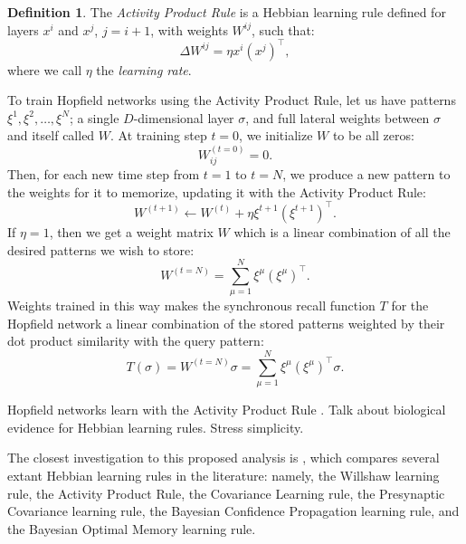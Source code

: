 \documentclass{article}
\theoremstyle{definition}
\newtheorem{definition}{Definition}[subsection]
\begin{document}
\begin{definition}
  The \textit{Activity Product Rule} is a Hebbian learning rule defined 
  for layers $x^i$ and $x^j$, $j = i+1$, with weights $W^{ij}$, such that:
  \begin{equation}
    \Delta W^{ij} = \eta x^i (x^j)^\top,
  \end{equation}
  where we call $\eta$ the \textit{learning rate}.
\end{definition}
\noindent
To train Hopfield networks using the Activity Product Rule,
let us have patterns $\xi^1, \xi^2, \dots, \xi^N$; a single 
$D$-dimensional layer $\sigma$, and full lateral weights between $\sigma$
and itself called $W$. At training step $t=0$, we initialize $W$ 
to be all zeros:
\begin{equation}
  W^{(t=0)}_{ij} = 0.
\end{equation}
Then, for each new time step from $t=1$ to $t = N$, we produce a new
pattern to the weights for it to memorize, updating it with 
the Activity Product Rule:
\begin{equation}
  W^{(t+1)} \gets W^{(t)} + \eta \xi^{t+1} (\xi^{t+1})^\top.
\end{equation}
If $\eta = 1$, then we get a weight matrix $W$ which is a 
linear combination of all the desired patterns we wish to store:
\begin{equation}
  W^{(t=N)} = \sum^N_{\mu=1} \xi^\mu (\xi^\mu)^\top.
\end{equation}
Weights trained in this way makes the synchronous recall function $T$
for the Hopfield network a linear combination of the stored patterns
weighted by their dot product similarity with the query pattern:
\begin{equation}
  T(\sigma) = W^{(t=N)} \sigma = \sum^N_{\mu=1} \xi^\mu (\xi^\mu)^\top \sigma.
\end{equation}


Hopfield networks learn with the Activity Product Rule
\parencite{haykin_neural_2009}.
Talk about biological evidence for Hebbian learning rules. Stress simplicity.

The closest investigation to this proposed analysis is
\textcite{lansner_benchmarking_2025}, which compares several
extant Hebbian learning rules in the literature: namely, the Willshaw
learning rule, the Activity Product Rule, the Covariance Learning rule,
the Presynaptic Covariance learning rule, the Bayesian Confidence Propagation
learning rule, and the Bayesian Optimal Memory learning rule.
\end{document}
